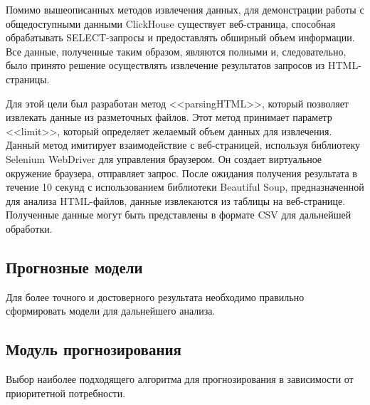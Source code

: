 Помимо вышеописанных методов извлечения данных, для демонстрации работы с общедоступными данными ClickHouse существует веб-страница, способная обрабатывать SELECT-запросы и предоставлять обширный объем информации. Все данные, полученные таким образом, являются полными и, следовательно, было принято решение осуществлять извлечение результатов запросов из HTML-страницы.

Для этой цели был разработан метод <<parsingHTML>>, который позволяет извлекать данные из разметочных файлов. Этот метод принимает параметр <<limit>>, который определяет желаемый объем данных для извлечения. Данный метод имитирует взаимодействие с веб-страницей, используя библиотеку Selenium WebDriver для управления браузером. Он создает виртуальное окружение браузера, отправляет запрос. После ожидания получения результата в течение 10 секунд с использованием библиотеки Beautiful Soup, предназначенной для анализа HTML-файлов, данные извлекаются из таблицы на веб-странице. Полученные данные могут быть представлены в формате CSV для дальнейшей обработки.

\subsection{Прогнозные модели}

Для более точного и достоверного результата необходимо правильно сформировать модели для дальнейшего анализа.

\subsection{Модуль прогнозирования}

Выбор наиболее подходящего алгоритма для прогнозирования в зависимости от приоритетной потребности.
